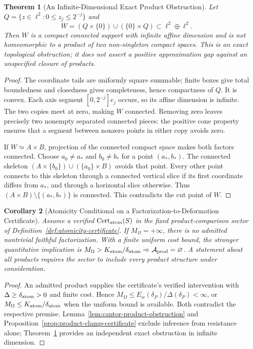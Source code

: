 \documentclass[11pt,a4paper]{article}
\theoremstyle{plain}
\newtheorem{theorem}{Theorem}[section]
\newtheorem{corollary}[theorem]{Corollary}
\theoremstyle{definition}
\theoremstyle{remark}
\begin{document}
\begin{theorem}[An Infinite-Dimensional Exact Product Obstruction]\label{thm:cutpoint-product-atomicity}
Let $Q=\{z\in\ell^2:0\le z_j\le2^{-j}\}$ and
\[
 W=(Q\times\{0\})\cup(\{0\}\times Q)\subset\ell^2\oplus\ell^2.
\]
Then $W$ is a compact connected support with infinite affine dimension and is not homeomorphic to a product of two non-singleton compact spaces. This is an exact topological obstruction; it does not assert a positive approximation gap against an unspecified closure of products.
\end{theorem}
\begin{proof}
The coordinate tails are uniformly square summable; finite boxes give total boundedness and closedness gives completeness, hence compactness of $Q$. It is convex. Each axis segment $[0,2^{-j}]e_j$ occurs, so its affine dimension is infinite. The two copies meet at zero, making $W$ connected. Removing zero leaves precisely two nonempty separated connected pieces: the positive cone property ensures that a segment between nonzero points in either copy avoids zero.

If $W\simeq A\times B$, projection of the connected compact space makes both factors connected. Choose $a_0\ne a_*$ and $b_0\ne b_*$ for a point $(a_*,b_*)$. The connected skeleton $(A\times\{b_0\})\cup(\{a_0\}\times B)$ avoids that point. Every other point connects to this skeleton through a connected vertical slice if its first coordinate differs from $a_*$, and through a horizontal slice otherwise. Thus $(A\times B)\setminus\{(a_*,b_*)\}$ is connected. This contradicts the cut point of $W$.
\end{proof}


\begin{corollary}[Atomicity Conditional on a Factorization-to-Deformation Certificate]\label{cor:indivisible}
Assume a verified $\mathrm{Cert}_{\rm atom}(S)$ in the fixed product-comparison sector of Definition~\ref{def:atomicity-certificate}. If $M_\Omega=+\infty$, there is no admitted nontrivial faithful factorization. With a finite uniform cost bound, the stronger quantitative implication is $M_\Omega>K_{\rm atom}/\delta_{\rm atom}\Rightarrow\mathcal A_{\rm prod}=\varnothing$. A statement about all products requires the sector to include every product structure under consideration.
\end{corollary}
\begin{proof}
An admitted product supplies the certificate's verified intervention with $\Delta\ge\delta_{\rm atom}>0$ and finite cost. Hence $M_\Omega\le E_w(\delta_P)/\Delta(\delta_P)<\infty$, or $M_\Omega\le K_{\rm atom}/\delta_{\rm atom}$ when the uniform bound is available. Both contradict the respective premise. Lemma~\ref{lem:cantor-product-obstruction} and Proposition~\ref{prop:product-clamp-certificate} exclude inference from resistance alone; Theorem~\ref{thm:cutpoint-product-atomicity} provides an independent exact obstruction in infinite dimension.
\end{proof}
\end{document}
